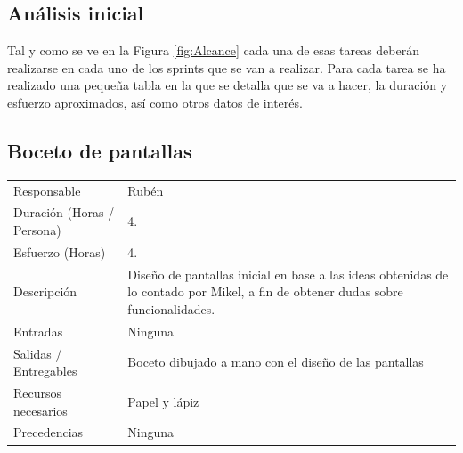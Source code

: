 \subsection{An\'{a}lisis inicial}
Tal y como se ve en la Figura \ref{fig:Alcance} cada una de esas tareas deber\'an realizarse en cada uno de los sprints
que se van a realizar. Para cada tarea se ha realizado una peque\~na tabla en la que se detalla que se va a hacer,
la duraci\'on y esfuerzo aproximados, as\'i como otros datos de inter\'es.

\subsection{Boceto de pantallas}
\begin{table}[H]
    \begin{center}
        \begin{tabular}{l p{8cm}}
            Responsable                           & Rub\'{e}n \\
            Duraci\'{o}n (Horas / Persona)        & 4. \\ 
            Esfuerzo (Horas)                      & 4. \\
            Descripci\'{o}n                       & Diseño de pantallas inicial en base a las ideas obtenidas de lo
                                                    contado por Mikel, a fin de obtener dudas sobre funcionalidades. \\
            Entradas                              & Ninguna \\
            Salidas / Entregables                 & Boceto dibujado a mano con el dise\~{n}o de las pantallas \\
            Recursos necesarios                   & Papel y l\'{a}piz \\
            Precedencias                          & Ninguna \\
        \end{tabular}
    \end{center}
            
\end{table}


